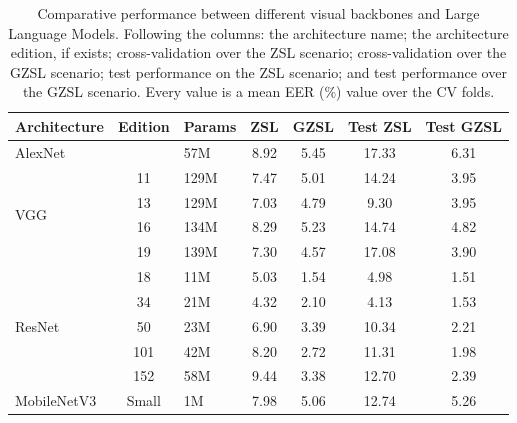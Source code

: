 \begin{table}[ht]
\caption{Comparative performance between different visual backbones and Large Language Models. Following the columns: the architecture name; the architecture edition, if exists; cross-validation over the \gls{ZSL} scenario; cross-validation over the \gls{GZSL} scenario; test performance on the \gls{ZSL} scenario; and test performance over the \gls{GZSL} scenario. Every value is a mean EER (\%) value over the \gls{CV} folds.}
\label{tab:res}
\centering
\setlength{\tabcolsep}{6pt} %
\begin{tabular}{lclcccc}
\toprule
Architecture                            & Edition & Params & \gls{ZSL}    & \gls{GZSL}    & Test \gls{ZSL} & Test \gls{GZSL} \\
\midrule
AlexNet                                 &         &  57M   & 8.92   & 5.45    & 17.33    & 6.31      \\ \midrule
\multirow{4}{*}{VGG}                    & 11      &  129M  & 7.47   & 5.01    & 14.24    & 3.95      \\
                                        & 13      &  129M  & 7.03   & 4.79    & 9.30     & 3.95      \\
                                        & 16      &  134M  & 8.29   & 5.23    & 14.74    & 4.82      \\
                                        & 19      &  139M  & 7.30   & 4.57    & 17.08    & 3.90      \\ \midrule
\multirow{5}{*}{ResNet}                 & 18      &  11M   & 5.03   & 1.54    & 4.98     & 1.51      \\
                                        & 34      &  21M   & 4.32   & 2.10    & 4.13     & 1.53      \\
                                        & 50      &  23M   & 6.90   & 3.39    & 10.34    & 2.21      \\
                                        & 101     &  42M   & 8.20   & 2.72    & 11.31    & 1.98      \\
                                        & 152     &  58M   & 9.44   & 3.38    & 12.70    & 2.39      \\ \midrule
\multirow{2}{*}{MobileNetV3}            & Small   &  1M    & 7.98   & 5.06    & 12.74    & 5.26      \\

\end{tabular}
\end{table}
